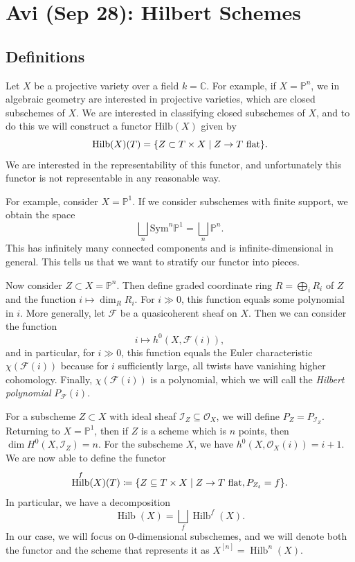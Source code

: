 \documentclass[leqno, openany]{memoir}
\theoremstyle{definition}
\theoremstyle{remark}
\theoremstyle{plain}
\theoremstyle{definition}
\theoremstyle{remark}
\newcommand{\C}{\mathbb{C}}
\renewcommand{\P}{\mathbb{P}}
\newcommand{\mc}[1]{\mathcal{#1}}
\newcommand{\mr}[1]{\mathrm{#1}}
\newcommand{\1}{\mathbf{1}}
\newcommand{\2}{\mathbf{2}}
\newcommand{\3}{\mathbf{3}}
\DeclareMathOperator{\Hilb}{Hilb}
\begin{document}
\chapter{Avi (Sep 28): Hilbert Schemes}%
\label{cha:avi_sep_28_hilbert_schemes}

\section{Definitions}%
\label{sec:definitions}

Let $X$ be a projective variety over a field $k = \C$. For example, if $X = \P^n$, we in algebraic geometry are interested in projective varieties, which are closed subschemes of $X$. We are interested in classifying closed subschemes of $X$, and to do this we will construct a functor $\mr{Hilb}(X)$ given by
\[ \Hilb(X)(T) = \qty{ Z \subset T \times X \mid Z \to T \text{ flat}}. \]
We are interested in the representability of this functor, and unfortunately this functor is not representable in any reasonable way.

For example, consider $X = \P^1$. If we consider subschemes with finite support, we obtain the space
\[ \bigsqcup_n \mr{Sym}^n \P^1 = \bigsqcup_n \P^n. \]
This has infinitely many connected components and is infinite-dimensional in general. This tells us that we want to stratify our functor into pieces.

Now consider $Z \subset X = \P^n$. Then define graded coordinate ring $R = \bigoplus_i R_i$ of $Z$ and the function $i \mapsto \dim_R R_i$. For $i \gg 0$, this function equals some polynomial in $i$. More generally, let $\mc{F}$ be a quasicoherent sheaf on $X$. Then we can consider the function
\[ i \mapsto h^0(X, \mc{F}(i)), \]
and in particular, for $i \gg 0$, this function equals the Euler characteristic $\chi(\mc{F}(i))$ because for $i$ sufficiently large, all twists have vanishing higher cohomology. Finally, $\chi(\mc{F}(i))$ is a polynomial, which we will call the \textit{Hilbert polynomial} $P_{\mc{F}}(i)$.

For a subscheme $Z \subset X$ with ideal sheaf $\mc{I}_Z \subseteq \mc{O}_X$, we will define $P_Z = P_{\mc{I}_Z}$. Returning to $X = \P^1$, then if $Z$ is a scheme which is $n$ points, then $\dim H^0(X, \mc{I}_Z) = n$. For the subscheme $X$, we have $h^0(X, \mc{O}_X(i)) = i+1$. We are now able to define the functor
\[ \Hilb^f(X)(T) \coloneqq \qty{Z \subseteq T \times X \mid Z \to T \text{ flat}, P_{Z_t} = f}. \]
In particular, we have a decomposition
\[ \Hilb(X) = \bigsqcup_f \Hilb^f(X). \]
In our case, we will focus on $0$-dimensional subschemes, and we will denote both the functor and the scheme that represents it as $X^{[n]} = \Hilb^n(X)$.
\end{document}
